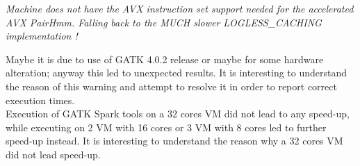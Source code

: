 \textit{Machine does not have the AVX instruction set support needed for the accelerated AVX PairHmm. Falling back to the MUCH slower LOGLESS\_CACHING implementation !}

Maybe it is due to use of GATK 4.0.2 release or maybe for some hardware alteration; anyway this led to unexpected results. It is interesting to understand the reason of this warning and attempt to resolve it in order to report correct execution times.
\\[1\baselineskip]
Execution of GATK Spark tools on a 32 cores VM did not lead to any speed-up, while executing on 2 VM with 16 cores or 3 VM with 8 cores led to further speed-up instead. It is interesting to understand the reason why a 32 cores VM did not lead speed-up.










